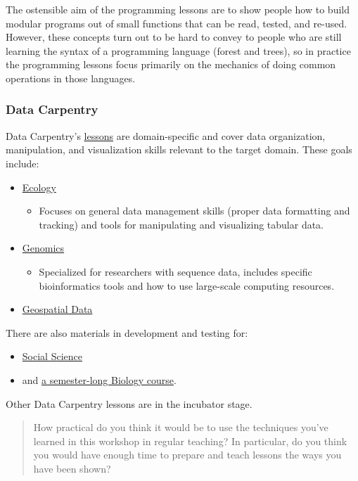 The ostensible aim of the programming lessons are to show people how to
build modular programs out of small functions that can be read, tested,
and re-used. However, these concepts turn out to be hard to convey to
people who are still learning the syntax of a programming language
(forest and trees), so in practice the programming lessons focus
primarily on the mechanics of doing common operations in those
languages.

\subsubsection{Data Carpentry}\label{data-carpentry}

Data Carpentry's \href{http://datacarpentry.org/lessons/}{lessons}
are domain-specific and cover data organization, manipulation, and
visualization skills relevant to the target domain. These goals include:

\begin{itemize}
\itemsep1pt\parskip0pt
\item
  \href{http://datacarpentry.org/lessons/\#ecology-workshop}{Ecology}

  \begin{itemize}
  \itemsep1pt\parskip0pt
  \item
    Focuses on general data management skills (proper data formatting
    and tracking) and tools for manipulating and visualizing tabular
    data.
  \end{itemize}
\item
  \href{http://datacarpentry.org/lessons/\#genomics-workshop}{Genomics}

  \begin{itemize}
  \itemsep1pt\parskip0pt
  \item
    Specialized for researchers with sequence data, includes specific
    bioinformatics tools and how to use large-scale computing
    resources.
  \end{itemize}
\item
  \href{http://datacarpentry.org/lessons/\#geospatial-data-workshop}{Geospatial
  Data}
\end{itemize}

There are also materials in development and testing for:

\begin{itemize}
\itemsep1pt\parskip0pt
\item
  \href{http://datacarpentry.org/lessons/\#social-science-materials}{Social
  Science}
\item
  and \href{http://datacarpentry.org/semester-biology/}{a
  semester-long Biology course}.
\end{itemize}

Other Data Carpentry lessons are in the incubator stage.

\begin{quote}
How practical do you think it would be to use the techniques you've
learned in this workshop in regular teaching? In particular, do you
think you would have enough time to prepare and teach lessons the ways
you have been shown?
\end{quote}
